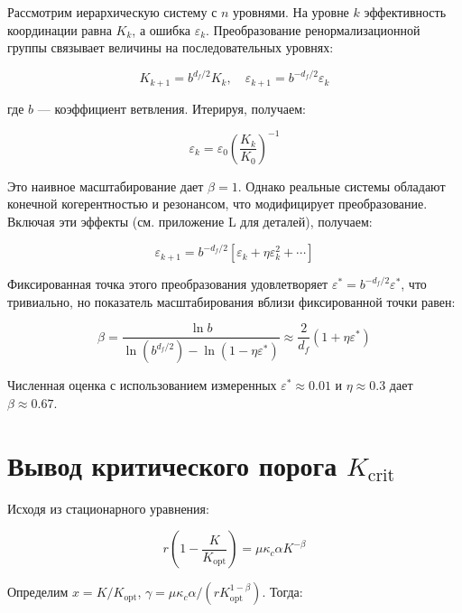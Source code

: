 \documentclass[12pt,a4paper]{article}
\theoremstyle{remark}
\newcommand{\Keffcrit}{K_{\mathrm{crit}}}
\newcommand{\kappac}{\kappa_c}
\newcommand{\eps}{\varepsilon}
\newcommand{\df}{d_{\!f}}
\begin{document}
	Рассмотрим иерархическую систему с $n$ уровнями. На уровне $k$ эффективность координации равна $K_k$, а ошибка $\eps_k$. Преобразование ренормализационной группы связывает величины на последовательных уровнях:
	
	\begin{equation}
		K_{k+1} = b^{\df/2} K_k, \quad \eps_{k+1} = b^{-\df/2} \eps_k
		\label{eq:rg}
	\end{equation}
	
	где $b$ — коэффициент ветвления. Итерируя, получаем:
	
	\begin{equation}
		\eps_k = \eps_0 \left( \frac{K_k}{K_0} \right)^{-1}
		\label{eq:rg-naive}
	\end{equation}
	
	Это наивное масштабирование дает $\beta = 1$. Однако реальные системы обладают конечной когерентностью и резонансом, что модифицирует преобразование. Включая эти эффекты (см. приложение L для деталей), получаем:
	
	\begin{equation}
		\eps_{k+1} = b^{-\df/2} \left[ \eps_k + \eta \eps_k^2 + \cdots \right]
		\label{eq:rg-corrected}
	\end{equation}
	
	Фиксированная точка этого преобразования удовлетворяет $\eps^* = b^{-\df/2} \eps^*$, что тривиально, но показатель масштабирования вблизи фиксированной точки равен:
	
	\begin{equation}
		\beta = \frac{\ln b}{\ln(b^{\df/2}) - \ln(1 - \eta \eps^*)} \approx \frac{2}{\df} (1 + \eta \eps^*)
		\label{eq:rg-beta}
	\end{equation}
	
	Численная оценка с использованием измеренных $\eps^* \approx 0.01$ и $\eta \approx 0.3$ дает $\beta \approx 0.67$.
	
	\section{Вывод критического порога $\Keffcrit$}
	\label{app:Kcrit}
	
	Исходя из стационарного уравнения:
	
	\begin{equation}
		r \left(1 - \frac{K}{K_{\text{opt}}}\right) = \mu \kappac \alpha K^{-\beta}
		\label{eq:stationary-app}
	\end{equation}
	
	Определим $x = K/K_{\text{opt}}$, $\gamma = \mu \kappac \alpha / (r K_{\text{opt}}^{1-\beta})$. Тогда:
	
\end{document}
